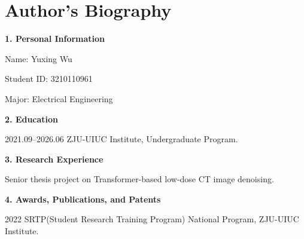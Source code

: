 \clearpage
\chapter*{Author's Biography}

\noindent\textbf{1. Personal Information}

Name: Yuxing Wu

Student ID: 3210110961

Major: Electrical Engineering

\vspace{1em}
\noindent\textbf{2. Education}

2021.09--2026.06 \quad ZJU-UIUC Institute, Undergraduate Program.

\vspace{1em}
\noindent\textbf{3. Research Experience}

Senior thesis project on Transformer-based low-dose CT image denoising.

\vspace{1em}
\noindent\textbf{4. Awards, Publications, and Patents}

2022 SRTP(Student Research Training Program) National Program, ZJU-UIUC Institute.
